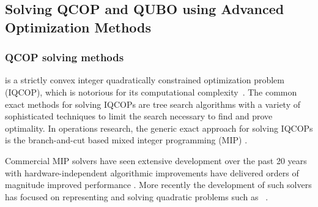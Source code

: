 \documentclass[preprint,12pt]{elsarticle}
\newcommand{\qcls}{{\sf {\small QC-LS\xspace}}}
\begin{document}
\subsection{Solving QCOP and QUBO using Advanced Optimization Methods}

\subsubsection{QCOP solving methods}
\label{quadratic}
\qcls{} is a strictly convex integer 
quadratically constrained optimization problem (IQCOP), which is notorious for its computational complexity~\cite{van1981another}.
The common exact methods for solving
IQCOPs are tree search \cite{land2010automatic} algorithms with a variety of sophisticated techniques to limit the search necessary to find and prove optimality.  In operations research, the generic exact approach for solving IQCOPs is the branch-and-cut based mixed integer programming (MIP) \cite{bonami2008algorithmic}.


Commercial MIP solvers have seen extensive development over the past 20 years with hardware-independent algorithmic improvements have delivered orders of magnitude improved performance \cite{Bixby07a}. More recently the development of such solvers has focused on representing and solving quadratic problems such as \qcls{}~\cite{Furini19a}.

\end{document}
